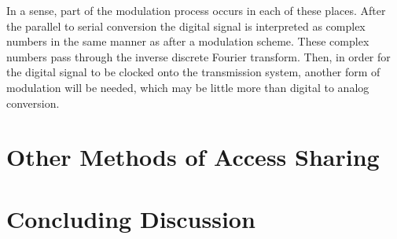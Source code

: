In a sense, part of the modulation process occurs in each of these places. After the parallel to
serial conversion the digital signal is interpreted as complex numbers in the same manner as
after a modulation scheme. These complex numbers pass through the inverse discrete Fourier
transform. Then, in order for the digital signal to be clocked onto the transmission system,
another form of modulation will be needed, which may be little more than digital to analog
conversion.


\section{Other Methods of Access Sharing}

\section{Concluding Discussion}


